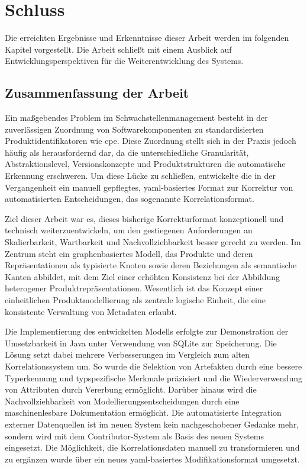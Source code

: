 \chapter{Schluss}\label{ch:abschluss}

Die erreichten Ergebnisse und Erkenntnisse dieser Arbeit werden im folgenden Kapitel vorgestellt.
Die Arbeit schließt mit einem Ausblick auf Entwicklungsperspektiven für die Weiterentwicklung des Systems.


\section{Zusammenfassung der Arbeit}\label{sec:schluss-zusammenfassung}

Ein maßgebendes Problem im Schwachstellenmanagement besteht in der zuverlässigen Zuordnung von Softwarekomponenten zu standardisierten Produktidentifikatoren wie \acrshort{cpe}.
Diese Zuordnung stellt sich in der Praxis jedoch häufig als herausfordernd dar, da die unterschiedliche Granularität, Abstraktionslevel, Versionskonzepte und Produktstrukturen die automatische Erkennung erschweren.
Um diese Lücke zu schließen, entwickelte die \metaeffektsp in der Vergangenheit ein manuell gepflegtes, \acrshort{yaml}-basiertes Format zur Korrektur von automatisierten Entscheidungen, das sogenannte Korrelationsformat.

Ziel dieser Arbeit war es, dieses bisherige Korrekturformat konzeptionell und technisch weiterzuentwickeln, um den gestiegenen Anforderungen an Skalierbarkeit, Wartbarkeit und Nachvollziehbarkeit besser gerecht zu werden.
Im Zentrum steht ein graphenbasiertes Modell, das Produkte und deren Repräsentationen als typisierte Knoten sowie deren Beziehungen als semantische Kanten abbildet, mit dem Ziel einer erhöhten Konsistenz bei der Abbildung heterogener Produktrepräsentationen.
Wesentlich ist das Konzept einer einheitlichen Produktmodellierung als zentrale logische Einheit, die eine konsistente Verwaltung von Metadaten erlaubt.

Die Implementierung des entwickelten Modells erfolgte zur Demonstration der Umsetzbarkeit in Java unter Verwendung von SQLite zur Speicherung.
Die Lösung setzt dabei mehrere Verbesserungen im Vergleich zum alten Korrelationssystem um.
So wurde die Selektion von Artefakten durch eine bessere Typerkennung und typspezifische Merkmale präzisiert und die Wiederverwendung von Attributen durch Vererbung ermöglicht.
Darüber hinaus wird die Nachvollziehbarkeit von Modellierungsentscheidungen durch eine maschinenlesbare Dokumentation ermöglicht.
Die automatisierte Integration externer Datenquellen ist im neuen System kein nachgeschobener Gedanke mehr, sondern wird mit dem Contributor-System als Basis des neuen Systems eingesetzt.
Die Möglichkeit, die Korrelationsdaten manuell zu transformieren und zu ergänzen wurde über ein neues \acrshort{yaml}-basiertes Modifikationsformat umgesetzt.

